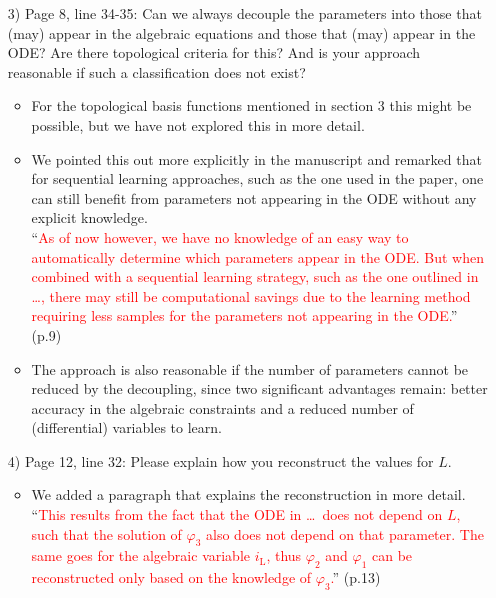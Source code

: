 \documentclass[a4paper, 10pt,
    ]{article}
\newcommand{\mr}[1]{\mathrm{#1}}
\begin{document}
\begin{itemize}
        \item[3)] \textcolor{TUDa-0c}{Page 8, line 34-35: Can we always decouple the parameters into those that (may) appear in the algebraic equations and those that (may) appear in the ODE? Are there topological criteria for this? And is your approach reasonable if such a classification does not exist?}
        \begin{itemize}
            \item For the topological basis functions mentioned in section 3 this might be possible, but we have not explored this in more detail.
            \item We pointed this out more explicitly in the manuscript and remarked that for sequential learning approaches, such as the one used in the paper, one can still benefit from parameters not appearing in the ODE without any explicit knowledge.\\
            ``\textcolor{red}{As of now however, we have no knowledge of an easy way to automatically determine which parameters appear in the ODE. But when combined with a sequential learning strategy, such as the one outlined in \dots, there may still be computational savings due to the learning method requiring less samples for the parameters not appearing in the ODE.}'' (p.9)
            \item The approach is also reasonable if the number of parameters cannot be reduced by the decoupling, since two significant advantages remain: better accuracy in the algebraic constraints and a reduced number of (differential) variables to learn.
        \end{itemize}

        \item[4)] \textcolor{TUDa-0c}{Page 12, line 32: Please explain how you reconstruct the values for $L$.}
        \begin{itemize}
            \item We added a paragraph that explains the reconstruction in more detail.\\
            ``\textcolor{red}{This results from the fact that the ODE in \dots\ does not depend on $L$, such that the solution of $\varphi_3$ also does not depend on that parameter. The same goes for the algebraic variable $i_\mr{L}$, thus $\varphi_2$ and $\varphi_1$ can be reconstructed only based on the knowledge of $\varphi_3$.}'' (p.13)
        \end{itemize}


\end{itemize}
\end{document}
